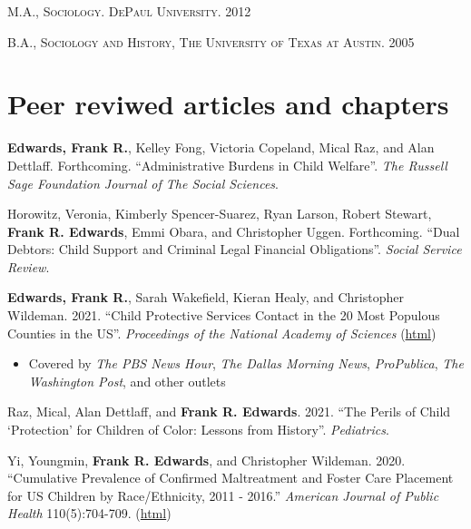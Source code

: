 \documentclass[margin,line]{res}
\begin{document}
\begin{resume}
\textsc{M.A., Sociology. DePaul University. 2012}

\textsc{B.A., Sociology and History, The University of Texas at Austin. 2005}



\section{\sc Peer reviwed articles and chapters}

\textbf{Edwards, Frank R.}, Kelley Fong, Victoria Copeland, Mical Raz, and Alan Dettlaff. Forthcoming. ``Administrative Burdens in Child Welfare''. \textit{The Russell Sage Foundation Journal of The Social Sciences}.

Horowitz, Veronia, Kimberly Spencer-Suarez, Ryan Larson, Robert Stewart, \textbf{Frank R. Edwards}, Emmi Obara, and Christopher Uggen. Forthcoming. ``Dual Debtors: Child Support and Criminal Legal Financial Obligations''. \textit{Social Service Review}.

\textbf{Edwards, Frank R.}, Sarah Wakefield, Kieran Healy, and Christopher Wildeman. 2021. ``Child Protective Services Contact in the 20 Most Populous Counties in the US''. \textit{Proceedings of the National Academy of Sciences} (\href{https://www.pnas.org/content/118/30/e2106272118}{html})

\begin{itemize}
  \item Covered by \textit{The PBS News Hour}, \textit{The Dallas Morning News}, \textit{ProPublica}, \textit{The Washington Post}, and other outlets
\end{itemize}

Raz, Mical, Alan Dettlaff, and \textbf{Frank R. Edwards}. 2021. ``The Perils of Child `Protection' for Children of Color: Lessons from History''. \textit{Pediatrics}.

Yi, Youngmin, \textbf{Frank R. Edwards}, and Christopher Wildeman. 2020. ``Cumulative Prevalence of Confirmed Maltreatment and Foster Care Placement for US Children by Race/Ethnicity, 2011 - 2016.'' \textit{American Journal of Public Health} 110(5):704-709. (\href{https://ajph.aphapublications.org/doi/abs/10.2105/AJPH.2019.305554}{html})


\end{resume}
\end{document}
